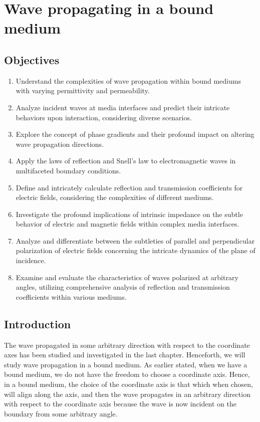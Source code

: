 \chapter{Wave propagating in a bound medium}\label{lec:lec30}

\begin{mdframed}[backgroundcolor=lightblue, linewidth=1pt, hidealllines=true]
\section{Objectives}
\begin{enumerate}[label=\roman*., itemsep=0pt, topsep=0pt]
\item Understand the complexities of wave propagation within bound mediums with varying permittivity and permeability.
\item Analyze incident waves at media interfaces and predict their intricate behaviors upon interaction, considering diverse scenarios.
\item Explore the concept of phase gradients and their profound impact on altering wave propagation directions.
\item Apply the laws of reflection and Snell's law to electromagnetic waves in multifaceted boundary conditions.
\item Define and intricately calculate reflection and transmission coefficients for electric fields, considering the complexities of different mediums.
\item Investigate the profound implications of intrinsic impedance on the subtle behavior of electric and magnetic fields within complex media interfaces.
\item Analyze and differentiate between the subtleties of parallel and perpendicular polarization of electric fields concerning the intricate dynamics of the plane of incidence.
\item Examine and evaluate the characteristics of waves polarized at arbitrary angles, utilizing comprehensive analysis of reflection and transmission coefficients within various mediums.
\end{enumerate}
\end{mdframed}

\section{Introduction}

The wave propagated in some arbitrary direction with respect to the coordinate axes has been studied and investigated in the last chapter. Henceforth, we will study wave propagation in a bound medium. As earlier stated, when we have a bound medium, we do not have the freedom to choose a coordinate axis. Hence, in a bound medium, the choice of the coordinate axis is that which when chosen, will align along the axis, and then the wave propagates in an arbitrary direction with respect to the coordinate axis because the wave is now incident on the boundary from some arbitrary angle.

